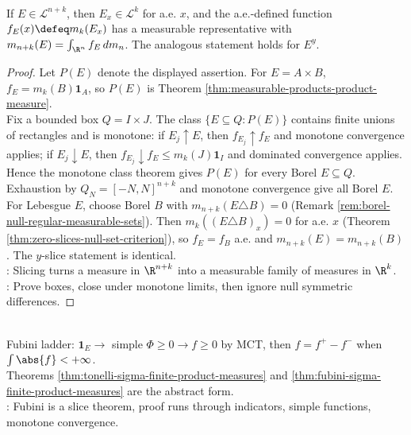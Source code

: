 \begin{theorem} \label{thm:cavalieri-principle-euclidean-slices} \\
If $E\in\mathcal{L}^{n+k}$, then $E_x\in\mathcal{L}^k$ for a.e. $x$, and the a.e.-defined function $f_E(x)\defeq m_k(E_x)$ has a measurable representative with $m_{n+k}(E)=\int_{\R^n} f_E\,dm_n$. The analogous statement holds for $E^y$.
\begin{proof}
Let $P(E)$ denote the displayed assertion. For $E=A\times B$, $f_E=m_k(B)\mathbf{1}_A$, so $P(E)$ is Theorem \ref{thm:measurable-products-product-measure}.\\
Fix a bounded box $Q=I\times J$. The class $\{E\subseteq Q:P(E)\}$ contains finite unions of rectangles and is monotone: if $E_j\uparrow E$, then $f_{E_j}\uparrow f_E$ and monotone convergence applies; if $E_j\downarrow E$, then $f_{E_j}\downarrow f_E\leq m_k(J)\mathbf{1}_I$ and dominated convergence applies. Hence the monotone class theorem gives $P(E)$ for every Borel $E\subseteq Q$. Exhaustion by $Q_N=[-N,N]^{n+k}$ and monotone convergence give all Borel $E$.\\
For Lebesgue $E$, choose Borel $B$ with $m_{n+k}(E\triangle B)=0$ (Remark \ref{rem:borel-null-regular-measurable-sets}). Then $m_k((E\triangle B)_x)=0$ for a.e. $x$ (Theorem \ref{thm:zero-slices-null-set-criterion}), so $f_E=f_B$ a.e. and $m_{n+k}(E)=m_{n+k}(B)$. The $y$-slice statement is identical.\\
: Slicing turns a measure in $\R^{n+k}$ into a measurable family of measures in $\R^k$.\\
: Prove boxes, close under monotone limits, then ignore null symmetric differences.
\end{proof}
\end{theorem}

\begin{perspective} \label{per:fubini-proof-ladder} \\
Fubini ladder: $\mathbf{1}_E\to$ simple $\Phi\geq0\to f\geq0$ by MCT, then $f=f^+-f^-$ when $\int\abs{f}<+\infty$.\\
Theorems \ref{thm:tonelli-sigma-finite-product-measures} and \ref{thm:fubini-sigma-finite-product-measures} are the abstract form.\\
: Fubini is a slice theorem, proof runs through indicators, simple functions, monotone convergence.
\end{perspective}

